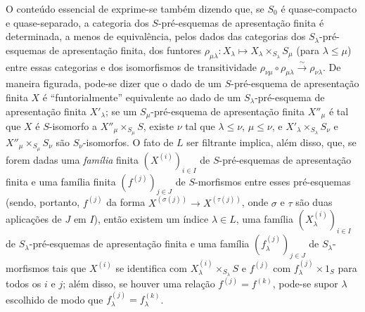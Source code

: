 \begin{env}[8.8.3]
\label{IV.8.8.3}
O conteúdo essencial de  exprime-se também dizendo que, se $S_0$ é quase-compacto e quase-separado, a categoria dos $S$-pré-esquemas de apresentação finita é determinada, a menos de equivalência, pelos dados das categorias dos $S_\lambda$-pré-esquemas de apresentação finita, dos funtores $\rho_{\mu\lambda}:X_\lambda\mapsto X_\lambda\times_{S_\lambda}S_\mu$ (para $\lambda\leqslant\mu$) entre essas categorias e dos isomorfismos de transitividade $\rho_{\nu\mu}\circ\rho_{\mu\lambda}\xrightarrow{\sim}\rho_{\nu\lambda}$.
De maneira figurada, pode-se dizer que o dado de um $S$-pré-esquema de apresentação finita $X$ é ``funtorialmente'' equivalente ao dado de um $S_\lambda$-pré-esquema de apresentação finita $X'_\lambda$; se um $S_\mu$-pré-esquema de apresentação finita $X''_\mu$ é tal que $X$ é $S$-isomorfo a $X''_\mu\times_{S_\mu}S$, existe $\nu$ tal que $\lambda\leqslant\nu$, $\mu\leqslant\nu$, e $X'_\lambda\times_{S_\lambda}S_\nu$ e $X''_\mu\times_{S_\mu}S_\nu$ são $S_\nu$-isomorfos.
O fato de $L$ ser filtrante implica, além disso, que, se forem dadas uma \emph{família} finita $(X^{(i)})_{i\in I}$ de $S$-pré-esquemas de apresentação finita e uma família finita $(f^{(j)})_{j\in J}$ de $S$-morfismos entre esses pré-esquemas (sendo, portanto, $f^{(j)}$ da forma $X^{(\sigma(j))}\to X^{(\tau(j))}$, onde $\sigma$ e $\tau$ são duas aplicações de $J$ em $I$), então existem um índice $\lambda\in L$, uma família $(X^{(i)}_\lambda)_{i\in I}$ de $S_\lambda$-pré-esquemas de apresentação finita e uma família $(f^{(j)}_\lambda)_{j\in J}$ de $S_\lambda$-morfismos tais que $X^{(i)}$ se identifica com $X^{(i)}_\lambda\times_{S_\lambda}S$ e $f^{(j)}$ com $f^{(j)}_\lambda\times 1_S$ para todos os $i$ e $j$; além disso, se houver uma relação $f^{(j)}=f^{(k)}$, pode-se supor $\lambda$ escolhido de modo que $f^{(j)}_\lambda=f^{(k)}_\lambda$.


\end{env}
